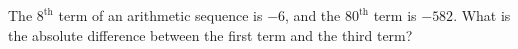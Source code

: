 The $8^\text{th}$ term of an arithmetic sequence is $-6$, and the $80^\text{th}$ term is $-582$. What is the absolute difference between the first term and the third term?
